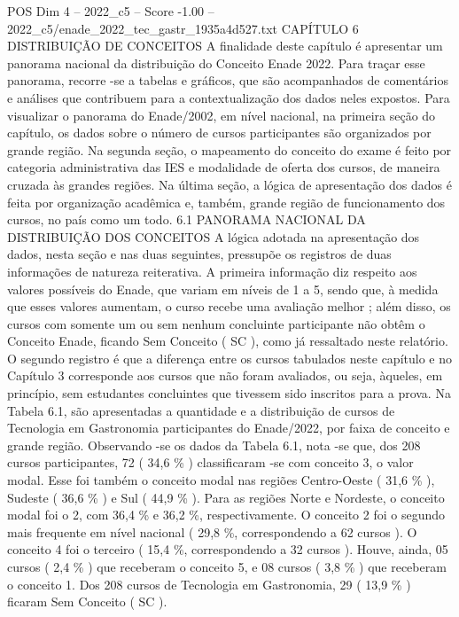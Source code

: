 \begin{textsample}{POS Dim 4 – 2022\_c5 – Score -1.00 – 2022\_c5/enade\_2022\_tec\_gastr\_1935a4d527.txt}  \label{ex:f4_pos_288}
CAPÍTULO 6 DISTRIBUIÇÃO DE CONCEITOS A finalidade deste capítulo é apresentar um panorama nacional da distribuição do Conceito Enade 2022.
Para traçar esse panorama, recorre -se a tabelas e gráficos, que são acompanhados de comentários e análises que contribuem para a contextualização dos dados neles expostos.
Para visualizar o panorama do Enade/2002, em nível nacional, na primeira seção do capítulo, os dados sobre o número de cursos participantes são organizados por grande região.
Na segunda seção, o mapeamento do conceito do exame é feito por categoria administrativa das IES e modalidade de oferta dos cursos, de maneira cruzada às grandes regiões.
Na última seção, a lógica de apresentação dos dados é feita por organização acadêmica e, também, grande região de funcionamento dos cursos, no país como um todo. 6.1 PANORAMA NACIONAL DA DISTRIBUIÇÃO DOS CONCEITOS A lógica adotada na apresentação dos dados, nesta seção e nas duas seguintes, pressupõe os registros de duas informações de natureza reiterativa.
A primeira informação diz respeito aos valores possíveis do Enade, que variam em níveis de 1 a 5, sendo que, à medida que esses valores aumentam, o curso recebe uma avaliação melhor ; além disso, os cursos com somente um ou sem nenhum concluinte participante não obtêm o Conceito Enade, ficando Sem Conceito ( SC ), como já ressaltado neste relatório.
O segundo registro é que a diferença entre os cursos tabulados neste capítulo e no Capítulo 3 corresponde aos cursos que não foram avaliados, ou seja, àqueles, em princípio, sem estudantes concluintes que tivessem sido inscritos para a prova.
Na Tabela 6.1, são apresentadas a quantidade e a distribuição de cursos de Tecnologia em Gastronomia participantes do Enade/2022, por faixa de conceito e grande região.
Observando -se os dados da Tabela 6.1, nota -se que, dos 208 cursos participantes, 72 ( 34,6 \% ) classificaram -se com conceito 3, o valor modal.
Esse foi também o conceito modal nas regiões Centro-Oeste ( 31,6 \% ), Sudeste ( 36,6 \% ) e Sul ( 44,9 \% ).
Para as regiões Norte e Nordeste, o conceito modal foi o 2, com 36,4 \% e 36,2 \%, respectivamente.
O conceito 2 foi o segundo mais frequente em nível nacional ( 29,8 \%, correspondendo a 62 cursos ).
O conceito 4 foi o terceiro ( 15,4 \%, correspondendo a 32 cursos ).
Houve, ainda, 05 cursos ( 2,4 \% ) que receberam o conceito 5, e 08 cursos ( 3,8 \% ) que receberam o conceito 1.
Dos 208 cursos de Tecnologia em Gastronomia, 29 ( 13,9 \% ) ficaram Sem Conceito ( SC ).

\end{textsample}
